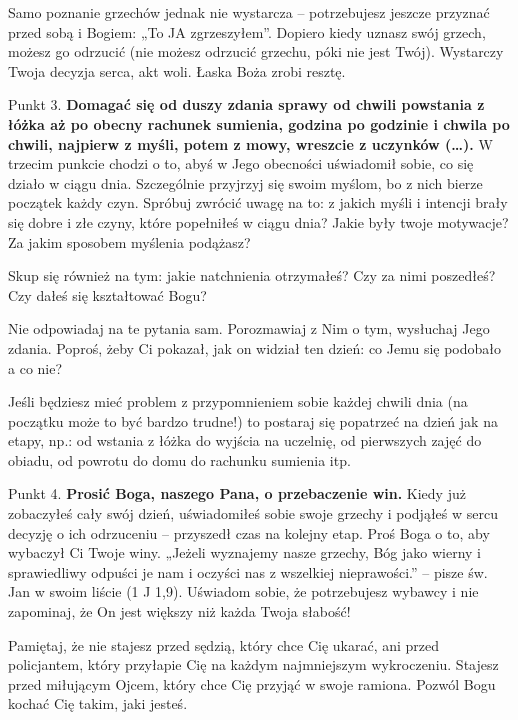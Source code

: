 \documentclass[twocolumn,fleqn,oneside,openany,a5paper,12pt]{book}
\begin{document}
Samo poznanie grzechów jednak nie wystarcza – potrzebujesz jeszcze przyznać przed sobą i Bogiem: „To JA zgrzeszyłem”. Dopiero kiedy uznasz swój grzech, możesz go odrzucić (nie możesz odrzucić grzechu, póki nie jest Twój). Wystarczy Twoja decyzja serca, akt woli. Łaska Boża zrobi resztę.

 

Punkt 3.
\textbf{Domagać się od duszy zdania sprawy od chwili powstania z łóżka aż po obecny rachunek sumienia, godzina po godzinie i chwila po chwili, najpierw z myśli, potem z mowy, wreszcie z uczynków (…). }
W trzecim punkcie chodzi o to, abyś w Jego obecności uświadomił sobie, co się działo w ciągu dnia. Szczególnie przyjrzyj się swoim myślom, bo z nich bierze początek każdy czyn. Spróbuj zwrócić uwagę na to: z jakich myśli i intencji brały się dobre i złe czyny, które popełniłeś w ciągu dnia? Jakie były twoje motywacje? Za jakim sposobem myślenia podążasz?

Skup się również na tym: jakie natchnienia otrzymałeś? Czy za nimi poszedłeś? Czy dałeś się kształtować Bogu?

Nie odpowiadaj na te pytania sam. Porozmawiaj z Nim o tym, wysłuchaj Jego zdania. Poproś, żeby Ci pokazał, jak on widział ten dzień: co Jemu się podobało a co nie?

Jeśli będziesz mieć problem z przypomnieniem sobie każdej chwili dnia (na początku może to być bardzo trudne!) to postaraj się popatrzeć na dzień jak na etapy, np.: od wstania z łóżka do wyjścia na uczelnię, od pierwszych zajęć do obiadu, od powrotu do domu do rachunku sumienia itp.

 

Punkt 4.
\textbf{Prosić Boga, naszego Pana, o przebaczenie win.}
Kiedy już zobaczyłeś cały swój dzień, uświadomiłeś sobie swoje grzechy i podjąłeś w sercu decyzję o ich odrzuceniu – przyszedł czas na kolejny etap. Proś Boga o to, aby wybaczył Ci Twoje winy. „Jeżeli wyznajemy nasze grzechy, 
Bóg jako wierny i sprawiedliwy odpuści je nam i oczyści nas z wszelkiej nieprawości.” – pisze św. Jan w swoim liście (1 J 1,9). Uświadom sobie, że potrzebujesz wybawcy i nie zapominaj, że On jest większy niż każda Twoja słabość!

Pamiętaj, że nie stajesz przed sędzią, który chce Cię ukarać, ani przed policjantem, który przyłapie Cię na każdym najmniejszym wykroczeniu. Stajesz przed miłującym Ojcem, który chce Cię przyjąć w swoje ramiona. Pozwól Bogu kochać Cię takim, jaki jesteś. 

 
\end{document}
